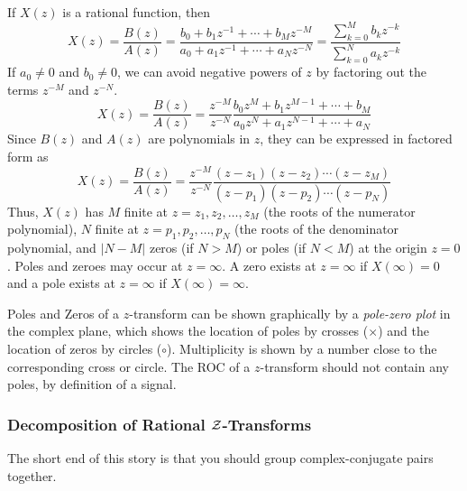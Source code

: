 If $X(z)$ is a rational function, then
\begin{equation*}
  X(z) = \frac{B(z)}{A(z)} = \frac{b_{0} + b_{1}z^{-1} + \cdots + b_{M}z^{-M}}{a_{0} + a_{1}z^{-1} + \cdots + a_{N}z^{-N}} = \frac{\sum_{k=0}^{M} b_{k}z^{-k}}{\sum_{k=0}^{N} a_{k}z^{-k}}
\end{equation*}
If $a_{0} \neq 0$ and $b_{0} \neq 0$, we can avoid negative powers of $z$ by factoring out the terms $z^{-M}$ and $z^{-N}$.
\begin{equation*}
  X(z) = \frac{B(z)}{A(z)} = \frac{z^{-M}}{z^{-N}} \frac{b_{0}z^{M} + b_{1}z^{M-1} + \cdots + b_{M}}{a_{0}z^{N} + a_{1}z^{N-1} + \cdots + a_{N}}
\end{equation*}
Since $B(z)$ and $A(z)$ are polynomials in $z$, they can be expressed in factored form as
\begin{equation}\label{eq:Rational Z-Transform Poles and Zeros Factored}
  X(z) = \frac{B(z)}{A(z)} = \frac{z^{-M}}{z^{-N}} \frac{(z-z_{1})(z-z_{2}) \cdots (z-z_{M})}{(z-p_{1})(z-p_{2}) \cdots (z-p_{N})}
\end{equation}
Thus, $X(z)$ has $M$ finite  at $z=z_{1},z_{2}, \ldots, z_{M}$ (the roots of the numerator polynomial), $N$ finite  at $z=p_{1},p_{2}, \ldots, p_{N}$ (the roots of the denominator polynomial, and $\lvert N-M \rvert$ zeros (if $N>M$) or poles (if $N<M$) at the origin $z=0$.
Poles and zeroes may occur at $z=\infty$.
A zero exists at $z=\infty$ if $X(\infty) = 0$ and a pole exists at $z=\infty$ if $X(\infty) = \infty$.

\begin{definition}\label{def:Pole-Zero Plot of Z-Transform}
  Poles and Zeros of a $z$-transform can be shown graphically by a \emph{pole-zero plot} in the complex plane, which shows the location of poles by crosses ($\times$) and the location of zeros by circles ($\circ$).
  Multiplicity is shown by a number close to the corresponding cross or circle.
  The ROC of a $z$-transform should not contain any poles, by definition of a  signal.
\end{definition}

\subsubsection{Decomposition of Rational \texorpdfstring{$\operatorname{\mathcal{Z}}$-Transforms}{Z-Transform}}\label{subsubsec:Decompose Rational Z-Transforms}
The short end of this story is that you should group complex-conjugate pairs together.

